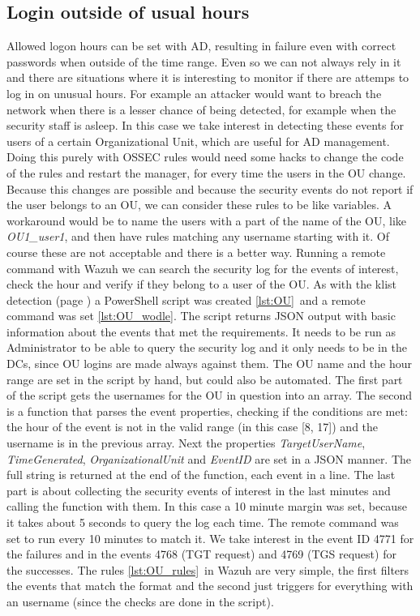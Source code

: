 \subsection{Login outside of usual hours}
Allowed logon hours can be set with AD, resulting in failure even with correct passwords when outside of the time range.
Even so we can not always rely in it and there are situations where it is interesting to monitor if there are attemps to log in on unusual hours.
For example an attacker would want to breach the network when there is a lesser chance of being detected, for example when the security staff is asleep.
In this case we take interest in detecting these events for users of a certain Organizational Unit, which are useful for AD management.
\linej
\linej
Doing this purely with OSSEC rules would need some hacks to change the code of the rules and restart the manager, for every time the users in the OU change.
Because this changes are possible and because the security events do not report if the user belongs to an OU, we can consider these rules to be like variables.
A workaround would be to name the users with a part of the name of the OU, like \textit{OU1\_user1}, and then have rules matching any username starting with it.
\linej
\linej
Of course these are not acceptable and there is a better way.
Running a remote command with Wazuh we can search the security log for the events of interest, check the hour and verify if they belong to a user of the OU.
As with the klist detection (page \pageref{klist_detection}) a PowerShell script was created \ref{lst:OU}\ and a remote command was set \ref{lst:OU_wodle}.
The script returns JSON output with basic information about the events that met the requirements.
It needs to be run as Administrator to be able to query the security log and it only needs to be in the DCs, since OU logins are made always against them.
The OU name and the hour range are set in the script by hand, but could also be automated.
\linej
\linej
The first part of the script gets the usernames for the OU in question into an array.
\linej
The second is a function that parses the event properties, checking if the conditions are met: the hour of the event is not in the valid range (in this case [8, 17]) and the username is in the previous array.
Next the properties \textit{TargetUserName}, \textit{TimeGenerated}, \textit{OrganizationalUnit} and \textit{EventID} are set in a JSON manner.
The full string is returned at the end of the function, each event in a line.
\linej
The last part is about collecting the security events of interest in the last minutes and calling the function with them. In this case a 10 minute margin was set, because it takes about 5 seconds to query the log each time. The remote command was set to run every 10 minutes to match it.
\linej
We take interest in the event ID 4771 for the failures and in the events 4768 (TGT request) and 4769 (TGS request) for the successes\cite{windows_events}.
\linej
\linej
The rules \ref{lst:OU_rules}\ in Wazuh are very simple, the first filters the events that match the format and the second just triggers for everything with an username (since the checks are done in the script).

